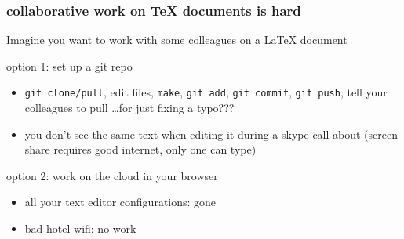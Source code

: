 \begin{frame}
  \frametitle{collaborative work on TeX documents is hard}

  Imagine you want to work with some colleagues on a LaTeX document
  \begin{block}{option 1: set up a git repo}
    \begin{itemize}
      \item \texttt{git clone/pull}, edit files, \texttt{make}, \texttt{git add}, \texttt{git commit}, \texttt{git push}, tell your colleagues to pull \dots for just fixing a typo???
      \item you don't see the same text when editing it during a skype call about 
        \newline (screen share requires good internet, only one can type)
    \end{itemize}
  \end{block}
  \begin{block}{option 2: work on the cloud in your browser}
    \begin{itemize}
      \item all your text editor configurations: gone
      \item bad hotel wifi: no work
    \end{itemize}
  \end{block}
\end{frame}

